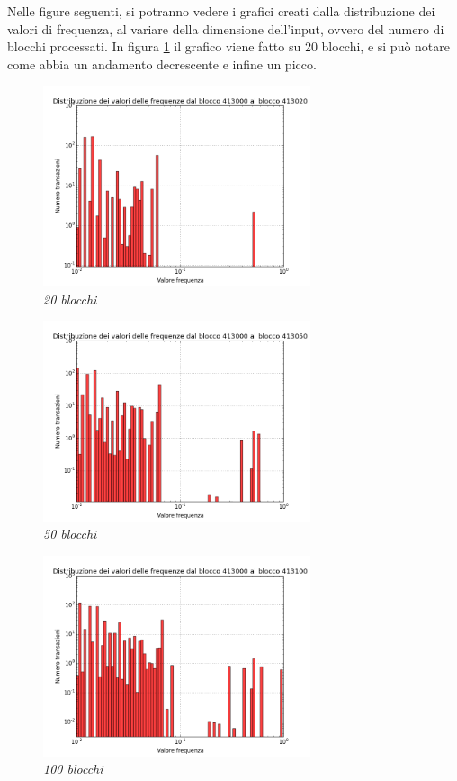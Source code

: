 Nelle figure seguenti, si potranno vedere i grafici creati dalla distribuzione dei valori di frequenza, al variare della dimensione dell'input, ovvero del numero di blocchi processati. In figura \ref{fig:hist20b} il grafico viene fatto su 20 blocchi, e si può notare come abbia un andamento decrescente e infine un picco.

\begin{figure}[htbp]
	\centering
		\includegraphics[width=0.7\textwidth]{figure/hist20b}
		\caption{\textit{20 blocchi}\label{fig:hist20b}}
\end{figure}
	
\begin{figure}[htbp]
	\centering
		\includegraphics[width=0.7\textwidth]{figure/hist50b}
		\caption{\textit{50 blocchi}\label{fig:hist50b}}
\end{figure}

\begin{figure}[htbp]
	\centering
		\includegraphics[width=0.7\textwidth]{figure/hist100b}
		\caption{\textit{100 blocchi}\label{fig:hist100b}}
\end{figure}
	
